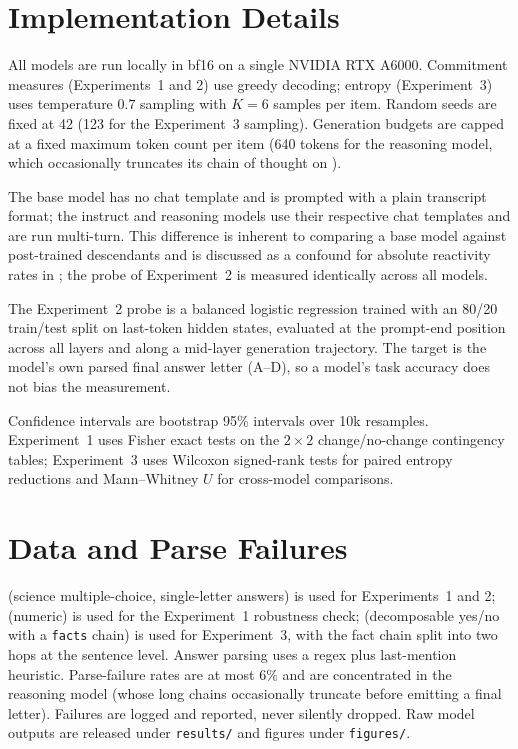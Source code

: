 \section{Implementation Details}
\label{app:impl}

 All models are run locally in bf16 on a single NVIDIA RTX
A6000. Commitment measures (Experiments~1 and 2) use greedy decoding; entropy
(Experiment~3) uses temperature $0.7$ sampling with $K=6$ samples per item. Random seeds are
fixed at 42 (123 for the Experiment~3 sampling). Generation budgets are capped at a fixed
maximum token count per item (640 tokens for the reasoning model, which occasionally truncates
its chain of thought on \arc).

 The base model has no chat template and is prompted with a plain transcript
format; the instruct and reasoning models use their respective chat templates and are run
multi-turn. This difference is inherent to comparing a base model against post-trained
descendants and is discussed as a confound for absolute reactivity rates in
; the probe of Experiment~2 is measured identically across all models.

 The Experiment~2 probe is a balanced logistic regression trained with an 80/20
train/test split on last-token hidden states, evaluated at the prompt-end position across all
layers and along a mid-layer generation trajectory. The target is the model's own parsed final
answer letter (A--D), so a model's task accuracy does not bias the measurement.

 Confidence intervals are bootstrap 95\% intervals over 10k resamples.
Experiment~1 uses Fisher exact tests on the $2\times2$ change/no-change contingency tables;
Experiment~3 uses Wilcoxon signed-rank tests for paired entropy reductions and Mann--Whitney
$U$ for cross-model comparisons.

\section{Data and Parse Failures}
\label{app:data}

\arc (science multiple-choice, single-letter answers) is used for Experiments~1 and 2; \gsm
(numeric) is used for the Experiment~1 robustness check; \strat (decomposable yes/no with a
\texttt{facts} chain) is used for Experiment~3, with the fact chain split into two hops at the
sentence level. Answer parsing uses a regex plus last-mention heuristic. Parse-failure rates
are at most $6\%$ and are concentrated in the reasoning model (whose long chains occasionally
truncate before emitting a final letter). Failures are logged and reported, never silently
dropped. Raw model outputs are released under \texttt{results/} and figures under
\texttt{figures/}.
